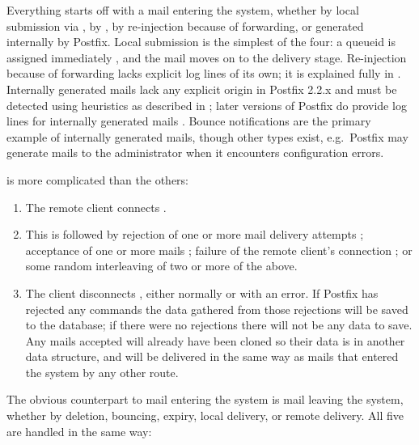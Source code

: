 Everything starts off with a mail entering the system, whether by local
submission via , by , by re-injection
because of forwarding, or generated internally by Postfix.  Local
submission is the simplest of the four: a queueid is assigned immediately
, and the mail moves on to the delivery stage.
Re-injection because of forwarding lacks explicit log lines of its own; it
is explained fully in .  Internally generated
mails lack any explicit origin in Postfix 2.2.x and must be detected using
heuristics as described in ;
later versions of Postfix do provide log lines for internally generated
mails .  Bounce notifications are the primary
example of internally generated mails, though other types exist, e.g.\
Postfix may generate mails to the administrator when it encounters
configuration errors.

 is more complicated than the others:

\begin{enumerate}

    \item The remote client connects .

    \item This is followed by rejection of one or more mail delivery attempts
        \flowchart{DELIVERY\_REJECTED}{4}; acceptance of one or more mails
        \flowchart{CLONE}{5}; failure of the remote client's connection
        \flowchart{DELIVERY\_ERROR}{6}; or some random interleaving of two
        or more of the above.

    \item The client disconnects , either
        normally or with an error.  If Postfix has rejected any
         commands the data gathered from those rejections
        will be saved to the database; if there were no rejections there
        will not be any data to save.  Any mails accepted will already have
        been cloned so their data is in another data structure, and will be
        delivered in the same way as mails that entered the system by any
        other route.

\end{enumerate}

The obvious counterpart to mail entering the system is mail leaving the
system, whether by deletion, bouncing, expiry, local delivery, or remote
delivery.  All five are handled in the same way:

